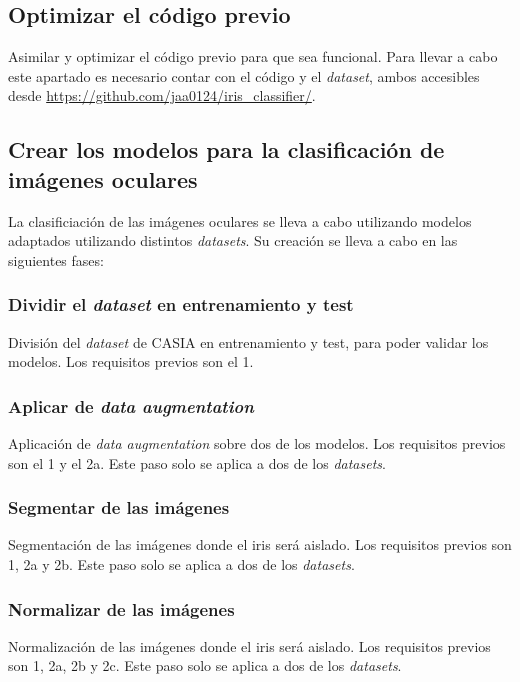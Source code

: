 \subsection{Optimizar el código previo}

Asimilar y optimizar el código previo para que sea funcional. Para llevar a cabo este apartado es necesario contar con el código y el \textit{dataset}, ambos accesibles desde \url{https://github.com/jaa0124/iris_classifier/}.

\subsection{Crear los modelos para la clasificación de imágenes oculares}

La clasificiación de las imágenes oculares se lleva a cabo utilizando modelos adaptados utilizando distintos \textit{datasets}. Su creación se lleva a cabo en las siguientes fases:

\subsubsection{Dividir el \textit{dataset} en entrenamiento y test}

División del \textit{dataset} de CASIA en entrenamiento y test, para poder validar los modelos. Los requisitos previos son el 1.

\subsubsection{Aplicar de \textit{data augmentation}}

Aplicación de \textit{data augmentation} sobre dos de los modelos. Los requisitos previos son el 1 y el 2a. Este paso solo se aplica a dos de los \textit{datasets}.

\subsubsection{Segmentar de las imágenes}

Segmentación de las imágenes donde el iris será aislado. Los requisitos previos son 1, 2a y 2b. Este paso solo se aplica a dos de los \textit{datasets}.

\subsubsection{Normalizar de las imágenes}

Normalización de las imágenes donde el iris será aislado. Los requisitos previos son 1, 2a, 2b y 2c. Este paso solo se aplica a dos de los \textit{datasets}.

